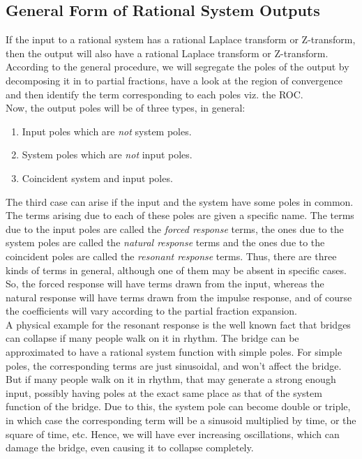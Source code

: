 \subsection{General Form of Rational System Outputs}
If the input to a rational system has a rational Laplace transform or Z-transform, then the output will also have a rational Laplace transform or Z-transform. According to the general procedure, we will segregate the poles of the output by decomposing it in to partial fractions, have a look at the region of convergence and then identify the term corresponding to each poles viz. the ROC.\\
Now, the output poles will be of three types, in general:
\begin{enumerate}
\item Input poles which are \emph{not} system poles.
\item System poles which are \emph{not} input poles.
\item Coincident system and input poles.
\end{enumerate}
The third case can arise if the input and the system have some poles in common. The terms arising due to each of these poles are given a specific name. The terms due to the input poles are called the \emph{forced response} terms, the ones due to the system poles are called the \emph{natural response} terms and the ones due to the coincident poles are called the \emph{resonant response} terms. Thus, there are three kinds of terms in general, although one of them may be absent in specific cases. So, the forced response will have terms drawn from the input, whereas the natural response will have terms drawn from the impulse response, and of course the coefficients will vary according to the partial fraction expansion.\\
A physical example for the resonant response is the well known fact that bridges can collapse if many people walk on it in rhythm. The bridge can be approximated to have a rational system function with simple poles. For simple poles, the corresponding terms are just sinusoidal, and won't affect the bridge. But if many people walk on it in rhythm, that may generate a strong enough input, possibly having poles at the exact same place as that of the system function of the bridge. Due to this, the system pole can become double or triple, in which case the corresponding term will be a sinusoid multiplied by time, or the square of time, etc. Hence, we will have ever increasing oscillations, which can damage the bridge, even causing it to collapse completely.
